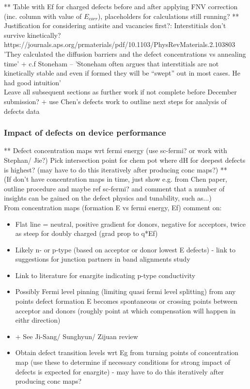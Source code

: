 \documentclass[11pt, twoside]{report}
\begin{document}
** Table with Ef for charged defects before and after applying FNV correction (inc. column with value of $E_{corr}$), placeholders for calculations still running? **\\

Justification for considering antisite and vacancies first?:
Interstitials don't survive kinetically?
https://journals.aps.org/prmaterials/pdf/10.1103/PhysRevMaterials.2.103803
'They calculated the diffusion barriers and the defect concentrations vs annealing time'
+ c.f Stoneham -- 'Stoneham often argues that interstitials are not kinetically stable and even if formed they will be “swept” out in most cases. He had good intuition'\\

Leave all subsequent sections as further work if not complete before December submission? + use Chen's defects work to outline next steps for analysis of defects data

\subsubsection{Impact of defects on device performance}

** Defect concentration maps wrt fermi energy (use sc-fermi? or work with Stephan/ Jie?) Pick intersection point for chem pot where dH for deepest defects is highest? (may have to do this iteratively after producing conc maps?) **\\

(If don't have concentration maps in time, just show e.g. from Chen paper, outline procedure and maybe ref sc-fermi? and comment that a number of insights can be gained on the defect physics and tunability, such as...)\\
From concentration maps (formation E vs fermi energy, Ef) comment on:
\begin{itemize}
\item Flat line = neutral, positive gradient for donors, negative for acceptors, twice as steep for doubly charged (grad prop to q*Ef)
\item Likely n- or p-type (based on acceptor or donor lowest E defects) - link to suggestions for junction partners in band alignments study
\item Link to literature for enargite indicating p-type conductivity
\item Possibly Fermi level pinning (limiting quasi fermi level splitting) from any points defect formation E becomes spontaneous or crossing points between acceptor and donors (roughly point at which compensation will happen in eithr direction)
\item + See Ji-Sang/ Sunghyun/ Zijuan review
\item Obtain defect transition levels wrt Eg from turning points of concentration map (use these to determine if necessary conditions for strong impact of defects is expected for enargite) - may have to do this iteratively after producing conc maps?
\end{itemize}
\end{document}
